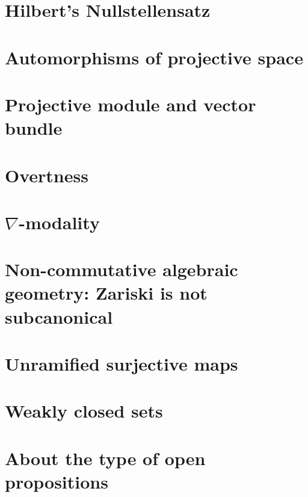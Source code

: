 \documentclass{../util/zariski}
\begin{document}
\section{Hilbert's Nullstellensatz}


\section{Automorphisms of projective space}


\section{Projective module and vector bundle}


\section{Overtness}


\section{$\nabla$-modality}


\section{Non-commutative algebraic geometry: Zariski is not subcanonical}


\section{Unramified surjective maps}


\section{Weakly closed sets}


\section{About the type of open propositions}


\printindex

\printbibliography
\end{document}
